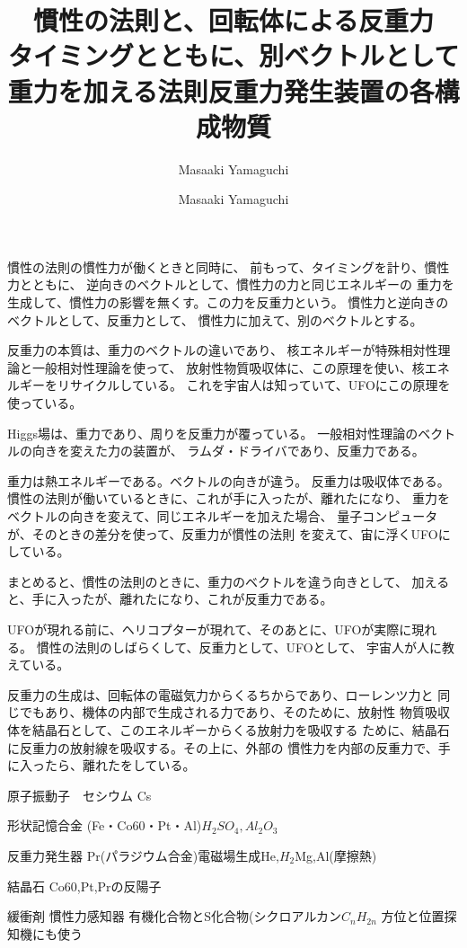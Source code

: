 \documentclass{jsarticle}
\begin{document}
{\title{慣性の法則と、回転体による反重力 \\
タイミングとともに、別ベクトルとして重力を加える法則}
\author{Masaaki Yamaguchi}


   慣性の法則の慣性力が働くときと同時に、
   前もって、タイミングを計り、慣性力とともに、
   逆向きのベクトルとして、慣性力の力と同じエネルギーの
   重力を生成して、慣性力の影響を無くす。この力を反重力という。
   慣性力と逆向きのベクトルとして、反重力として、
   慣性力に加えて、別のベクトルとする。

   反重力の本質は、重力のベクトルの違いであり、
   核エネルギーが特殊相対性理論と一般相対性理論を使って、
   放射性物質吸収体に、この原理を使い、核エネルギーをリサイクルしている。
   これを宇宙人は知っていて、UFOにこの原理を使っている。

   Higgs場は、重力であり、周りを反重力が覆っている。
   一般相対性理論のベクトルの向きを変えた力の装置が、
   ラムダ・ドライバであり、反重力である。

   重力は熱エネルギーである。ベクトルの向きが違う。
   反重力は吸収体である。
   慣性の法則が働いているときに、これが手に入ったが、離れたになり、
   重力をベクトルの向きを変えて、同じエネルギーを加えた場合、
   量子コンピュータが、そのときの差分を使って、反重力が慣性の法則
   を変えて、宙に浮くUFOにしている。 

   まとめると、慣性の法則のときに、重力のベクトルを違う向きとして、
   加えると、手に入ったが、離れたになり、これが反重力である。 

   UFOが現れる前に、ヘリコプターが現れて、そのあとに、UFOが実際に現れる。
   慣性の法則のしばらくして、反重力として、UFOとして、
   宇宙人が人に教えている。

   反重力の生成は、回転体の電磁気力からくるちからであり、ローレンツ力と
   同じでもあり、機体の内部で生成される力であり、そのために、放射性
   物質吸収体を結晶石として、このエネルギーからくる放射力を吸収する
   ために、結晶石に反重力の放射線を吸収する。その上に、外部の
   慣性力を内部の反重力で、手に入ったら、離れたをしている。


\title{反重力発生装置の各構成物質}
\author{Masaaki Yamaguchi}


  原子振動子　セシウム Cs


  形状記憶合金 (Fe・Co60・Pt・Al)$H_2 SO_4, Al_2 O_3$


  反重力発生器 Pr(パラジウム合金)電磁場生成He,$H_2$Mg,Al(摩擦熱)


  結晶石 Co60,Pt,Prの反陽子


  緩衝剤 慣性力感知器 有機化合物とS化合物(シクロアルカン$C_n H_{2n}$
  方位と位置探知機にも使う


}
\end{document}

